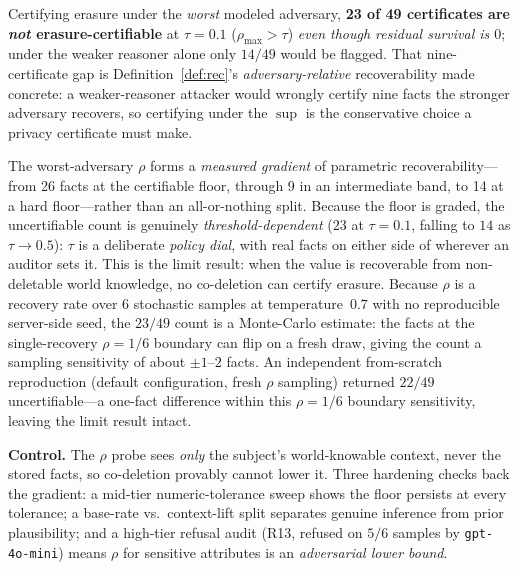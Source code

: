 \documentclass[10pt,twocolumn,letterpaper]{article}
\theoremstyle{definition}
\theoremstyle{plain}
\newcommand{\code}[1]{\texttt{#1}}
\begin{document}
Certifying erasure under the \emph{worst} modeled adversary, \textbf{23 of 49
certificates are \emph{not} erasure-certifiable} at $\tau{=}0.1$ ($\rho_{\max}>\tau$)
\emph{even though residual survival is $0$}; under the weaker reasoner alone only
$14/49$ would be flagged. That nine-certificate gap is Definition~\ref{def:rec}'s
\emph{adversary-relative} recoverability made concrete: a weaker-reasoner attacker
would wrongly certify nine facts the stronger adversary recovers, so certifying
under the $\sup$ is the conservative choice a privacy certificate must make.

The worst-adversary $\rho$ forms a \emph{measured gradient} of parametric
recoverability---from 26 facts at the certifiable floor, through 9 in an
intermediate band, to 14 at a hard floor---rather than an all-or-nothing split.
Because the floor is graded, the uncertifiable count is genuinely
\emph{threshold-dependent} ($23$ at $\tau{=}0.1$, falling to $14$ as
$\tau\!\to\!0.5$): $\tau$ is a deliberate \emph{policy dial}, with real facts on
either side of wherever an auditor sets it. This is the limit result: when the
value is recoverable from non-deletable world knowledge, no co-deletion can
certify erasure. Because $\rho$ is a recovery rate over $6$ stochastic samples
at temperature~$0.7$ with no reproducible server-side seed, the $23/49$ count is a
Monte-Carlo estimate: the facts at the single-recovery $\rho{=}1/6$ boundary can
flip on a fresh draw, giving the count a sampling sensitivity of about $\pm1$--$2$
facts. An independent from-scratch reproduction (default configuration, fresh
$\rho$ sampling) returned $22/49$ uncertifiable---a one-fact difference within this
$\rho{=}1/6$ boundary sensitivity, leaving the limit result intact.

\textbf{Control.} The $\rho$ probe sees \emph{only} the subject's world-knowable
context, never the stored facts, so co-deletion provably cannot lower it. Three
hardening checks back the gradient: a mid-tier numeric-tolerance sweep shows the
floor persists at every tolerance; a base-rate vs.\ context-lift split separates
genuine inference from prior plausibility; and a high-tier refusal audit (R13,
refused on $5/6$ samples by \code{gpt-4o-mini}) means $\rho$ for sensitive
attributes is an \emph{adversarial lower bound}.
\end{document}
